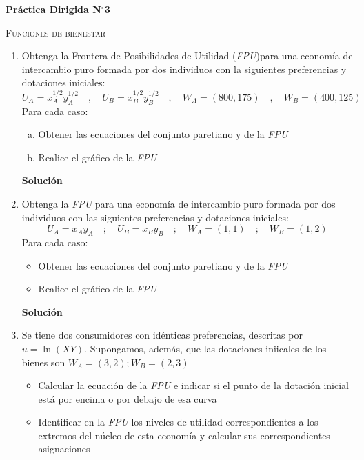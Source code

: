\documentclass[10pt,a4paper]{article}
\begin{document}
	\begin{center}
		{\Large {\textbf{Práctica Dirigida N$^{\circ}$3}}}

		\textsc{Funciones de bienestar}
		
	\end{center}
\begin{enumerate}
	\item Obtenga la Frontera de Posibilidades de Utilidad (\emph{FPU})para una economía de intercambio puro formada por dos individuos con la siguientes preferencias y dotaciones iniciales:
			$$U_A = x_{A}^{1/2}y_{A}^{1/2}\quad , \quad U_B = x_{B}^{1/2}y_{B}^{1/2}\quad , \quad W_A = (800, 175)\quad , \quad W_B = (400, 125)$$
		  Para cada caso:
		  	\begin{enumerate}[a)]
		  		\item Obtener las ecuaciones del conjunto paretiano y de la \emph{FPU}
		  		\item Realice el gráfico de la \emph{FPU}
		  	\end{enumerate}
			\textbf{\LARGE Solución}\\
				
	\item Obtenga la \emph{FPU} para una economía de intercambio puro formada por dos individuos con las siguientes preferencias y dotaciones iniciales:
			$$U_A = x_Ay_A \quad ; \quad U_B = x_By_B \quad ; \quad W_A = (1,1)\quad ; \quad W_B = (1,2)$$
		  Para cada caso:
		  	\begin{itemize}
		  		\item Obtener las ecuaciones del conjunto paretiano y de la \emph{FPU}
		  		\item Realice el gráfico de la \emph{FPU}
		  	\end{itemize}
	  		\textbf{\LARGE Solución}\\
	  			
	\item Se tiene dos consumidores con idénticas preferencias, descritas por $u = \ln(XY)$. Supongamos, además, que las dotaciones iniicales de los bienes son $W_A = (3,2); W_B=(2,3)$
			\begin{itemize}
				\item Calcular la ecuación de la \emph{FPU} e indicar si el punto de la dotación inicial está por encima o por debajo de esa curva
				\item Identificar en la \emph{FPU} los niveles de utilidad correspondientes a los extremos del núcleo de esta economía y calcular sus correspondientes asignaciones

\end{itemize}
\end{enumerate}
\end{document}
